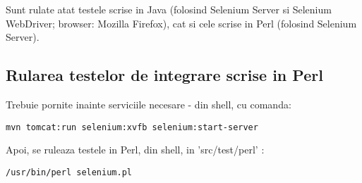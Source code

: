 
Sunt rulate atat testele scrise in Java 
(folosind Selenium Server si Selenium WebDriver; browser: Mozilla Firefox), 
cat si cele scrise in Perl (folosind Selenium Server).

\subsection{Rularea testelor de integrare scrise in Perl}
Trebuie pornite inainte serviciile necesare - din shell, cu comanda:
\begin{lstlisting}[breaklines=true]
	mvn tomcat:run selenium:xvfb selenium:start-server
\end{lstlisting}
Apoi, se ruleaza testele in Perl, din shell, in 'src/test/perl' :
\begin{lstlisting}[breaklines=true]
	/usr/bin/perl selenium.pl
\end{lstlisting}


\begin{comment}
\subsection{Rularea automata a testelor web (Selenium)}
Din shell, in folder-ul radacina al proiectului 'roda', cu comanda:
\begin{lstlisting}
	mvn tomcat:run selenium:selenese
\end{lstlisting}
\end{comment}


